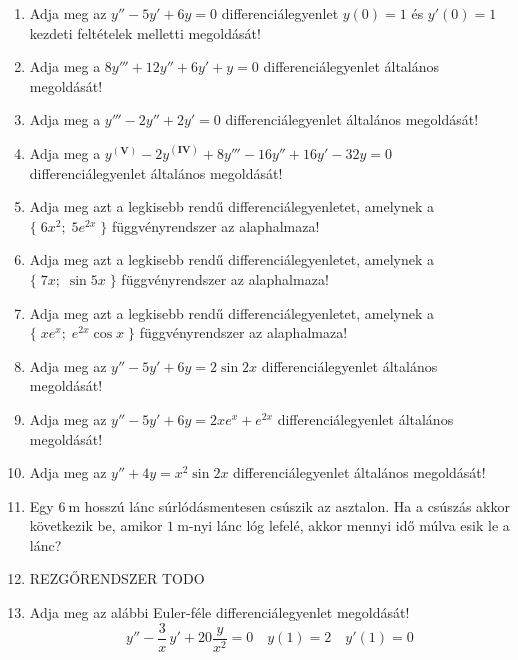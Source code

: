 \documentclass{szb-practice}
\begin{document}
\begin{enumerate}
  \item Adja meg az $y'' - 5y' + 6y = 0$ differenciálegyenlet $y(0) = 1$ és
        $y'(0) = 1$ kezdeti feltételek melletti megoldását!

  \item Adja meg a $8y''' + 12y'' + 6y' + y = 0$ differenciálegyenlet
        általános megoldását!

  \item Adja meg a $y''' - 2y'' + 2y' = 0$ differenciálegyenlet
        általános megoldását!

  \item Adja meg a $y^{(\mathbf{V})} - 2y^{(\mathbf{IV})} + 8y''' - 16y'' + 16y'
          -32y = 0$ differenciálegyenlet általános megoldását!

  \item Adja meg azt a legkisebb rendű differenciálegyenletet, amelynek a
        $\{\; 6x^2; \; 5e^{2x} \;\}$ függvényrendszer az alaphalmaza!

  \item Adja meg azt a legkisebb rendű differenciálegyenletet, amelynek a
        $\{\; 7x; \; \sin 5x \;\}$ függvényrendszer az alaphalmaza!

  \item Adja meg azt a legkisebb rendű differenciálegyenletet, amelynek a
        $\{\; x e^x; \; e^{2x} \cos x \;\}$ függvényrendszer az alaphalmaza!

  \item Adja meg az $y'' - 5y' + 6y = 2 \sin 2x$ differenciálegyenlet
        általános megoldását!

  \item Adja meg az $y'' - 5y' + 6y = 2x e^x + e^{2x}$ differenciálegyenlet
        általános megoldását!

  \item Adja meg az $y'' + 4y = x^2 \sin 2x$ differenciálegyenlet
        általános megoldását!

  \item Egy $\SI{6}{\meter}$ hosszú lánc súrlódásmentesen csúszik az asztalon.
        Ha a csúszás akkor következik be, amikor $\SI{1}{\meter}$-nyi lánc
        lóg lefelé, akkor mennyi idő múlva esik le a lánc?

  \item REZGŐRENDSZER TODO

  \item Adja meg az alábbi Euler-féle differenciálegyenlet megoldását!
        $$
          y'' - \frac{3}{x} \, y' + 20 \frac{y}{x^2} = 0
          \quad
          y(1) = 2
          \quad
          y'(1) = 0
        $$


\end{enumerate}
\end{document}
